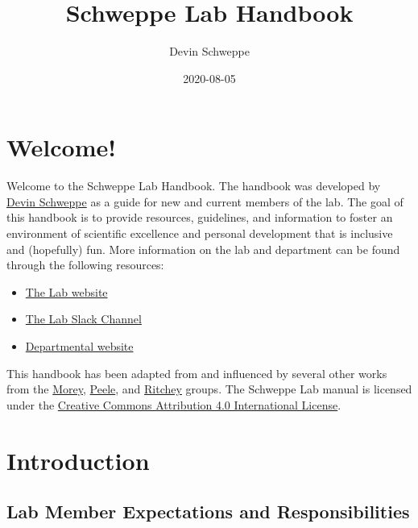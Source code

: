 \documentclass[
]{book}
\title{Schweppe Lab Handbook}
\author{Devin Schweppe}
\date{2020-08-05}
\providecommand{\tightlist}{%
  \setlength{\itemsep}{0pt}\setlength{\parskip}{0pt}}
\begin{document}
\maketitle

{
\setcounter{tocdepth}{1}
\tableofcontents
}
\hypertarget{welcome}{%
\chapter{Welcome!}\label{welcome}}

Welcome to the Schweppe Lab Handbook. The handbook was developed by \href{https://www.schweppelab.org/}{Devin Schweppe} as a guide for new and current members of the lab. The goal of this handbook is to provide resources, guidelines, and information to foster an environment of scientific excellence and personal development that is inclusive and (hopefully) fun. More information on the lab and department can be found through the following resources:

\begin{itemize}
\tightlist
\item
  \href{https://www.schweppelab.org}{The Lab website}
\item
  \href{https://schweppelab.slack.com/}{The Lab Slack Channel}
\item
  \href{https://www.gs.washington.edu/}{Departmental website}
\end{itemize}

This handbook has been adapted from and influenced by several other works from the \href{https://ccmorey.github.io/labHandbook/index.html}{Morey}, \href{https://github.com/jpeelle/peellelab_manual/blob/master/peellelab_manual.pdf}{Peele}, and \href{http://www.thememolab.org/resources/}{Ritchey} groups. The Schweppe Lab manual is licensed under the \href{https://creativecommons.org/licenses/by/4.0/}{Creative Commons Attribution 4.0 International License}.

\hypertarget{intro}{%
\chapter{Introduction}\label{intro}}

\hypertarget{lab-member-expectations-and-responsibilities}{%
\section{Lab Member Expectations and Responsibilities}\label{lab-member-expectations-and-responsibilities}}
\end{document}
